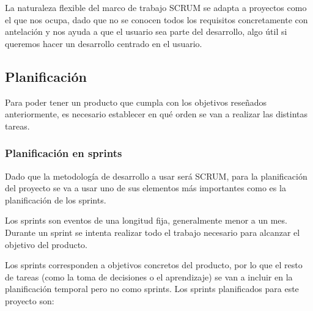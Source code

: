 La naturaleza flexible del marco de trabajo SCRUM se adapta a proyectos como el que nos ocupa, dado que no se conocen todos los requisitos concretamente con antelación y nos ayuda a que el usuario sea parte del desarrollo, algo útil si queremos hacer un desarrollo centrado en el usuario.

\subsection{Planificación}

Para poder tener un producto que cumpla con los objetivos reseñados anteriormente, es necesario establecer en qué orden se van a realizar las distintas tareas.


\subsubsection{Planificación en sprints}

Dado que la metodología de desarrollo a usar será SCRUM, para la planificación del proyecto se va a usar uno de sus elementos más importantes como es la planificación de los sprints. 

Los sprints son eventos de una longitud fija, generalmente menor a un mes. Durante un sprint se intenta realizar todo el trabajo necesario para alcanzar el objetivo del producto.

Los sprints corresponden a objetivos concretos del producto, por lo que el resto de tareas (como la toma de decisiones o el aprendizaje) se van a incluir en la planificación temporal pero no como sprints. Los sprints planificados para este proyecto son:

